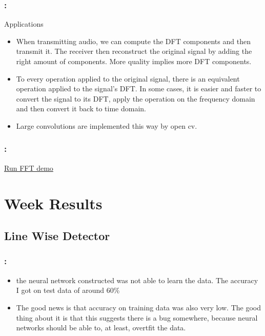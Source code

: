 \documentclass{beamer}
\begin{document}
\begin{frame}
  \frametitle{\secname : \subsecname}
  \begin{exampleblock}{Applications}
    \begin{itemize}
        \item When transmitting audio, we can compute the DFT components and then transmit it. The receiver then
          reconstruct the original signal by adding the right amount of components. More quality implies more DFT
          components. 
        \item To every operation applied to the original signal, there is an equivalent operation applied to the
          signal's DFT. In some cases, it is easier and faster to convert the signal to its DFT, apply the operation on
          the frequency domain and then convert it back to time domain.
        \item Large convolutions are implemented this way by open cv.
    \end{itemize}
  \end{exampleblock}
\end{frame}

\begin{frame}
  \frametitle{\secname : \subsecname}
  \href{run:runFFT_Demo.sh}{Run FFT demo}
\end{frame}

\section{Week Results}
\subsection{Line Wise Detector}
\begin{frame}
  \frametitle{\secname : \subsecname}
  \begin{itemize}
      \item the neural network constructed was not able to learn the data. The accuracy I got on test data of around
        60\%
      \item The good news is that accuracy on training data was also very low. The good thing about it is that this
        suggests there is a bug somewhere, because neural networks should be able to, at least, overtfit the data. 
  \end{itemize}
\end{frame}
\end{document}
